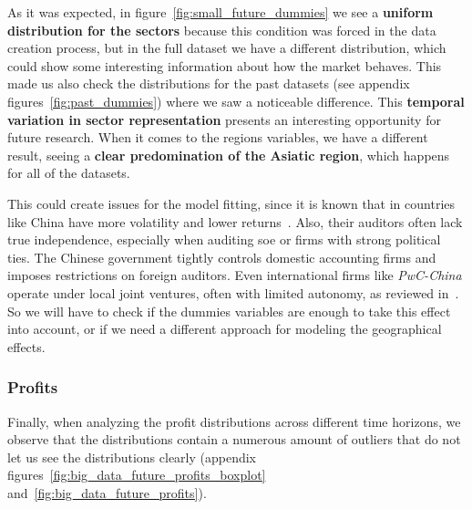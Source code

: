 \documentclass[11pt,english,a4paper,hidelinks]{book}
\begin{document}
\noindent As it was expected, in figure~\ref{fig:small_future_dummies} we see a \textbf{uniform distribution for the sectors} because this condition was forced in the data creation process, but in the full dataset we have a different distribution, which could show some interesting information about how the market behaves. This made us also check the distributions for the past datasets (see appendix figures~\ref{fig:past_dummies}) where we saw a noticeable difference. This \textbf{temporal variation in sector representation} presents an interesting opportunity for future research. When it comes to the regions variables, we have a different result, seeing a \textbf{clear predomination of the Asiatic region}, which happens for all of the datasets. 

\vspace{0.5cm}
\noindent This could create issues for the model fitting, since it is known that in countries like China have more volatility and lower returns~\cite{chen2024economic}. Also, their auditors often lack true independence, especially when auditing \gls{soe} or firms with strong political ties. The Chinese government tightly controls domestic accounting firms and imposes restrictions on foreign auditors. Even international firms like \textit{PwC-China} operate under local joint ventures, often with limited autonomy, as reviewed in~\cite{LIU2012782}. So we will have to check if the dummies variables are enough to take this effect into account, or if we need a different approach for modeling the geographical effects.

\subsubsection{Profits}

\noindent Finally, when analyzing the profit distributions across different time horizons, we observe that the distributions contain a numerous amount of outliers that do not let us see the distributions clearly (appendix figures~\ref{fig:big_data_future_profits_boxplot} and~\ref{fig:big_data_future_profits}).
\end{document}
